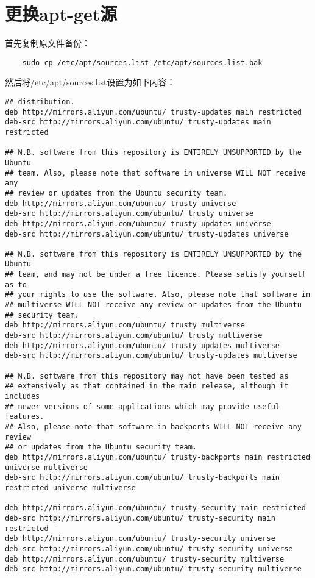 \documentclass[a4paper,left=2.5cm,right=2.5cm,11pt]{article}
\begin{document}

\clearpage

\section{更换apt-get源}
	首先复制原文件备份：
	\begin{lstlisting}
	sudo cp /etc/apt/sources.list /etc/apt/sources.list.bak
	\end{lstlisting}

	然后将/etc/apt/sources.list设置为如下内容：
	\begin{lstlisting}
## distribution.
deb http://mirrors.aliyun.com/ubuntu/ trusty-updates main restricted
deb-src http://mirrors.aliyun.com/ubuntu/ trusty-updates main restricted

## N.B. software from this repository is ENTIRELY UNSUPPORTED by the Ubuntu
## team. Also, please note that software in universe WILL NOT receive any
## review or updates from the Ubuntu security team.
deb http://mirrors.aliyun.com/ubuntu/ trusty universe
deb-src http://mirrors.aliyun.com/ubuntu/ trusty universe
deb http://mirrors.aliyun.com/ubuntu/ trusty-updates universe
deb-src http://mirrors.aliyun.com/ubuntu/ trusty-updates universe

## N.B. software from this repository is ENTIRELY UNSUPPORTED by the Ubuntu 
## team, and may not be under a free licence. Please satisfy yourself as to 
## your rights to use the software. Also, please note that software in 
## multiverse WILL NOT receive any review or updates from the Ubuntu
## security team.
deb http://mirrors.aliyun.com/ubuntu/ trusty multiverse
deb-src http://mirrors.aliyun.com/ubuntu/ trusty multiverse
deb http://mirrors.aliyun.com/ubuntu/ trusty-updates multiverse
deb-src http://mirrors.aliyun.com/ubuntu/ trusty-updates multiverse

## N.B. software from this repository may not have been tested as
## extensively as that contained in the main release, although it includes
## newer versions of some applications which may provide useful features.
## Also, please note that software in backports WILL NOT receive any review
## or updates from the Ubuntu security team.
deb http://mirrors.aliyun.com/ubuntu/ trusty-backports main restricted universe multiverse
deb-src http://mirrors.aliyun.com/ubuntu/ trusty-backports main restricted universe multiverse

deb http://mirrors.aliyun.com/ubuntu/ trusty-security main restricted
deb-src http://mirrors.aliyun.com/ubuntu/ trusty-security main restricted
deb http://mirrors.aliyun.com/ubuntu/ trusty-security universe
deb-src http://mirrors.aliyun.com/ubuntu/ trusty-security universe
deb http://mirrors.aliyun.com/ubuntu/ trusty-security multiverse
deb-src http://mirrors.aliyun.com/ubuntu/ trusty-security multiverse


\end{lstlisting}
\end{document}
